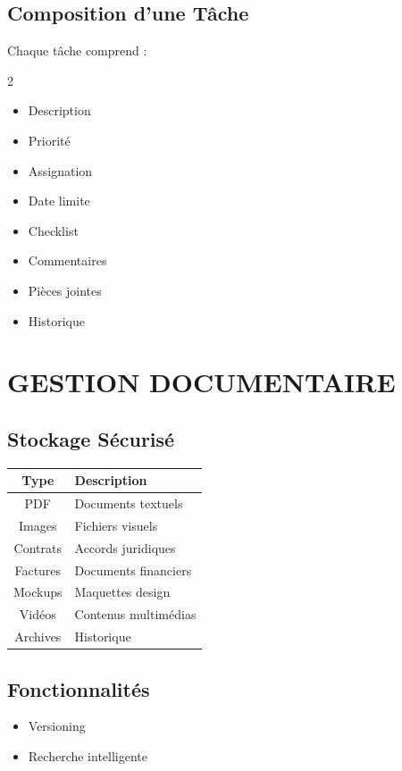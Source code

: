 \documentclass[12pt,a4paper,oneside]{book}
\begin{document}
\section{Composition d'une Tâche}
Chaque tâche comprend :
\begin{multicols}{2}
\begin{itemize}
\item Description
\item Priorité
\item Assignation
\item Date limite
\item Checklist
\item Commentaires
\item Pièces jointes
\item Historique
\end{itemize}
\end{multicols}

\chapter{GESTION DOCUMENTAIRE}

\section{Stockage Sécurisé}
\begin{center}
\begin{tabular}{|c|p{10cm}|}
\hline
\rowcolor{electroncyan}
\color{white}\textbf{Type} & \color{white}\textbf{Description} \\
\hline
PDF & Documents textuels \\
\hline
Images & Fichiers visuels \\
\hline
Contrats & Accords juridiques \\
\hline
Factures & Documents financiers \\
\hline
Mockups & Maquettes design \\
\hline
Vidéos & Contenus multimédias \\
\hline
Archives & Historique \\
\hline
\end{tabular}
\end{center}

\section{Fonctionnalités}
\begin{itemize}
\item Versioning
\item Recherche intelligente
\end{itemize}
\end{document}
